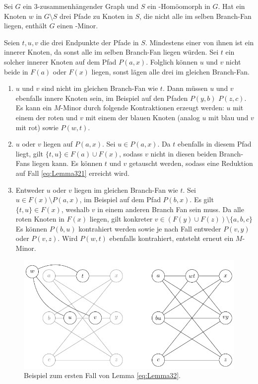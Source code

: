 \begin{lemma}\label{eq:Lemma32}
  Sei $G$ ein $3$-zusammenhängender Graph und $S$ ein \kdd-Homöomorph in $G$.
  Hat ein Knoten $w$ in $G \setminus S$ drei Pfade zu Knoten in $S$, die nicht alle im selben Branch-Fan liegen, enthält $G$ einen \kf-Minor.
\end{lemma}
\begin{beweis}
  Seien $t, u, v$ die drei Endpunkte der Pfade in $S$.
  Mindestens einer von ihnen ist ein innerer Knoten, da sonst alle im selben Branch-Fan liegen würden.
  Sei \oBdA $t$ ein solcher innerer Knoten auf dem Pfad $P(a, x)$.
  Folglich können $u$ und $v$ nicht beide in $F(a)$ oder $F(x)$ liegen, sonst lägen alle drei im gleichen Branch-Fan.
  \begin{enumerate}
    \item $u$ und $v$ sind nicht im gleichen Branch-Fan wie $t$. \label{eq:Lemma321}
          Dann müssen $u$ und $v$ ebenfalls innere Knoten sein, im Beispiel auf den Pfaden $P(y, b)$ \bzw $P(z, c)$.
          Es kann ein $M$-Minor durch folgende Kontraktionen erzeugt werden: $u$ mit einem der roten und $v$ mit einem der blauen Knoten (analog $u$ mit blau und $v$ mit rot) sowie $P(w, t)$.
    \item $u$ oder $v$ liegen auf $P(a, x)$. \label{eq:Lemma322}
          Sei \oBdA $u \in P(a, x)$.
          Da $t$ ebenfalls in diesem Pfad liegt, gilt $\{t, u\} \in F(a) \cup F(x)$, sodass $v$ nicht in diesen beiden Branch-Fans liegen kann.
          Es können $t$ und $v$ getauscht werden, sodass eine Reduktion auf Fall \ref{eq:Lemma321} erreicht wird.
    \item Entweder $u$ oder $v$ liegen im gleichen Branch-Fan wie $t$. \label{eq:Lemma323}
          Sei \oBdA $u \in F(x) \setminus P(a, x)$, im Beispiel auf dem Pfad $P(b, x)$.
          Es gilt $\{t, u\} \in F(x)$, weshalb $v$ in einem anderen Branch Fan sein muss.
          Da alle roten Knoten in $F(x)$ liegen, gilt konkreter $v \in (F(y) \cup F(z)) \setminus \{a, b, c\}$
          Es können $P(b, u)$ kontrahiert werden sowie je nach Fall entweder $P(v, y)$ oder $P(v, z)$.
          Wird $P(w, t)$ ebenfalls kontrahiert, entsteht erneut ein $M$-Minor.
  \end{enumerate}
\end{beweis}
\begin{figure}[H]
  \centering
  \includegraphics[keepaspectratio]{bilder/Lemma321.pdf}
  \caption{Beispiel zum ersten Fall von Lemma \ref{eq:Lemma32}.}
  \label{fig:Lemma321}
\end{figure}
